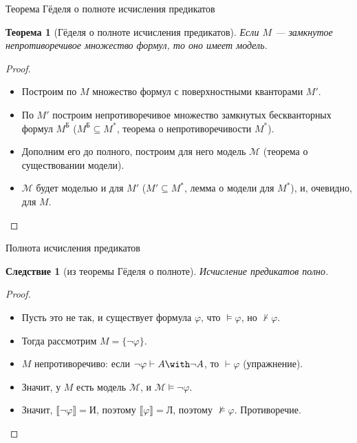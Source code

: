 \documentclass[aspectratio=169]{beamer}
\newtheorem{thm}{Теорема}[section]
\newtheorem{flw}{Следствие}[section]
\begin{document}
\begin{frame}{Теорема Гёделя о полноте исчисления предикатов}
\begin{thm}[Гёделя о полноте исчисления предикатов]
Если $M$ --- замкнутое непротиворечивое множество формул, то оно имеет модель.\pause
\end{thm}
\begin{proof}
\begin{itemize}
\item Построим по $M$ множество формул с поверхностными кванторами $M'$.\pause
\item По $M'$ построим непротиворечивое множество замкнутых бескванторных формул $M^\text{Б}$ ($M^\text{Б}\subseteq M^*$, теорема о непротиворечивости $M^*$).\pause
\item Дополним его до полного, построим для него модель $\mathcal{M}$ (теорема о существовании модели).\pause
\item $\mathcal{M}$ будет моделью и для $M'$ ($M'\subseteq M^*$, лемма о модели для $M^*$), и, очевидно, для $M$.
\end{itemize}
\end{proof}
\end{frame}

\begin{frame}{Полнота исчисления предикатов}
\begin{flw}[из теоремы Гёделя о полноте]
Исчисление предикатов полно.
\end{flw}
\begin{proof}
\begin{itemize}
\item Пусть это не так, и существует формула $\varphi$, что $\models\varphi$, но $\not\vdash\varphi$.\pause
\item Тогда рассмотрим $M = \{\neg\varphi\}$. \pause
\item $M$ непротиворечиво: если $\neg\varphi \vdash A\with\neg A$, то $\vdash \varphi$ (упражнение).\pause
\item Значит, у $M$ есть модель $\mathcal{M}$, и $\mathcal{M}\models\neg\varphi$. \pause
\item Значит, $\llbracket \neg\varphi \rrbracket = \text{И}$, поэтому $\llbracket \varphi \rrbracket = \text{Л}$,
поэтому $\not\models\varphi$. Противоречие.
\end{itemize}
\end{proof}
\end{frame}
\end{document}
